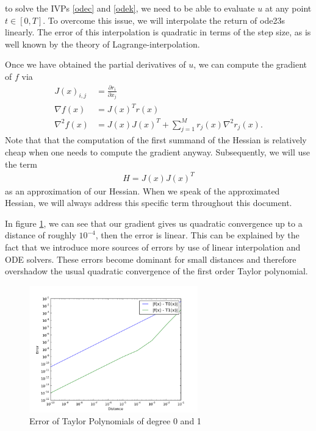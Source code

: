 \documentclass{article}
\begin{document}
to solve the IVPs \ref{odec} and \ref{odek}, we need to be able to evaluate $u$ at any point $t \in [0,T]$. To overcome this issue,
we will interpolate the return of ode23s linearly. The error of this interpolation
is quadratic in terms of the step size, as is well known by the theory of Lagrange-interpolation. \par
Once we have obtained the partial derivatives of $u$, we can compute the gradient of $f$
via 
\begin{align*}
  J(x)_{i,j}&=\frac{\partial r_i}{\partial x_j} \\
  \nabla f(x)&=J(x)^{T} r(x) \\
  \nabla^2 f(x)& =J(x)J(x)^T+\sum_{j=1}^M r_j(x) \nabla^2 r_j(x).
\end{align*}
Note that that the computation of the first summand of the Hessian is relatively
cheap when one needs to compute the gradient anyway. Subsequently, we will
use the term 
\begin{align*}
 H= J(x)J(x)^T
\end{align*}
as an approximation of our Hessian. When we speak of the approximated Hessian,
we will always address this specific term throughout this document.\par
In figure \ref{taylor}, we can see that our gradient gives us quadratic convergence up to a distance of roughly $10^{-4}$, then
the error is linear. This can be explained by the fact that we introduce more sources of errors by use of linear interpolation
and ODE solvers. These errors become dominant for small distances and therefore overshadow the usual quadratic convergence of 
the first order Taylor polynomial.
\begin{figure}
    \centering
        \includegraphics[width=0.65\textwidth]{check_derivative}
        \caption{Error of Taylor Polynomials of degree 0 and 1}
        \label{taylor}
\end{figure}
\end{document}
